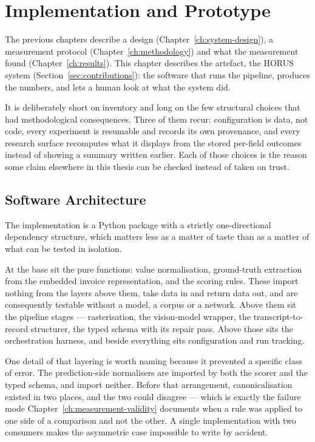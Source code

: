 \chapter{Implementation and Prototype}
\label{ch:implementation}

The previous chapters describe a design (Chapter~\ref{ch:system-design}), a measurement
protocol (Chapter~\ref{ch:methodology}) and what the measurement found
(Chapter~\ref{ch:results}). This chapter describes the artefact, the HORUS system
(Section~\ref{sec:contributions}): the software that runs the pipeline, produces the numbers, and
lets a human look at what the system did.

It is deliberately short on inventory and long on the few structural choices that had
methodological consequences. Three of them recur: configuration is data, not code,
every experiment is resumable and records its own provenance, and every research surface
recomputes what it displays from the stored per-field outcomes instead of showing a summary
written earlier. Each of those choices is the reason some claim elsewhere in this thesis can
be checked instead of taken on trust.

\section{Software Architecture}
\label{sec:sys-architecture}

The implementation is a Python package with a strictly one-directional dependency structure,
which matters less as a matter of taste than as a matter of what can be tested in isolation.

At the base sit the pure functions: value normalisation, ground-truth extraction from the
embedded invoice representation, and the scoring rules. These import nothing from the layers
above them, take data in and return data out, and are consequently testable without a model,
a corpus or a network. Above them sit the pipeline stages --- rasterisation, the vision-model
wrapper, the transcript-to-record structurer, the typed schema with its repair pass. Above
those sits the orchestration harness, and beside everything sits configuration and run
tracking.

One detail of that layering is worth naming because it prevented a specific class of error.
The prediction-side normalisers are imported by both the scorer and the typed schema, and
import neither. Before that arrangement, canonicalisation existed in two places, and the two
could disagree --- which is exactly the failure mode Chapter~\ref{ch:measurement-validity}
documents when a rule was applied to one side of a comparison and not the other. A single
implementation with two consumers makes the asymmetric case impossible to write by accident.


